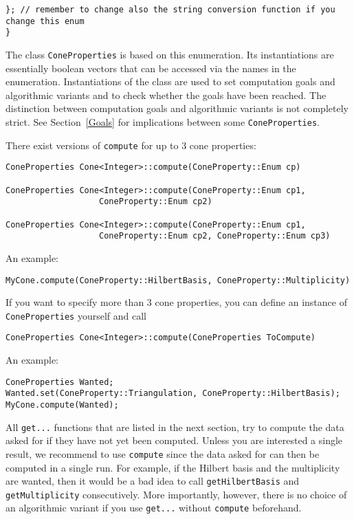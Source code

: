 \begin{small}
\begin{Verbatim}
}; // remember to change also the string conversion function if you change this enum
}
\end{Verbatim}

The class \verb|ConeProperties| is based on this enumeration. Its instantiations are essentially boolean vectors that can be accessed via the names in the enumeration. Instantiations of the class are used to set computation goals and algorithmic variants and to check whether the goals have been reached. The distinction between computation goals and algorithmic variants is not completely strict. See Section~\ref{Goals} for implications between some \verb|ConeProperties|.

There exist versions of \verb|compute| for up to $3$ cone properties:
\begin{Verbatim}
ConeProperties Cone<Integer>::compute(ConeProperty::Enum cp)

ConeProperties Cone<Integer>::compute(ConeProperty::Enum cp1, 
                   ConeProperty::Enum cp2)

ConeProperties Cone<Integer>::compute(ConeProperty::Enum cp1, 
                   ConeProperty::Enum cp2, ConeProperty::Enum cp3)
\end{Verbatim}

An example:
\begin{Verbatim}
MyCone.compute(ConeProperty::HilbertBasis, ConeProperty::Multiplicity)
\end{Verbatim}

If you want to specify more than $3$ cone properties, you can define an instance of \verb|ConeProperties| yourself and call
\begin{Verbatim}
ConeProperties Cone<Integer>::compute(ConeProperties ToCompute)
\end{Verbatim}

An example:
\begin{Verbatim}
ConeProperties Wanted;
Wanted.set(ConeProperty::Triangulation, ConeProperty::HilbertBasis);
MyCone.compute(Wanted);
\end{Verbatim}

All \verb|get...| functions that are listed in the next section, try to compute the data asked for if they have not yet been computed. Unless you are interested a single result, we recommend to use \verb|compute| since the data asked for can then be computed in a single run. For example, if the Hilbert basis and the multiplicity are wanted, then it would be a bad idea to call \verb|getHilbertBasis| and \verb|getMultiplicity| consecutively. More importantly, however, there is no choice of an algorithmic variant if you use \verb|get...| without \verb|compute| beforehand.


\end{small}
